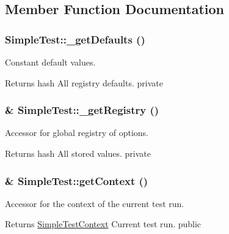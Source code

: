 \subsection{Member Function Documentation}
\hypertarget{class_simple_test_aca4dc7253ba3fb6593993372d955c5c4}{
\subsubsection[{\_\-getDefaults}]{\setlength{\rightskip}{0pt plus 5cm}SimpleTest::\_\-getDefaults ()}}
\label{class_simple_test_aca4dc7253ba3fb6593993372d955c5c4}
Constant default values. \begin{DoxyReturn}{Returns}
hash All registry defaults.  private 
\end{DoxyReturn}
\hypertarget{class_simple_test_a89b05bdd90acbaa574ea20d088e99b0f}{
\subsubsection[{\_\-getRegistry}]{\setlength{\rightskip}{0pt plus 5cm}\& SimpleTest::\_\-getRegistry ()}}
\label{class_simple_test_a89b05bdd90acbaa574ea20d088e99b0f}
Accessor for global registry of options. \begin{DoxyReturn}{Returns}
hash All stored values.  private 
\end{DoxyReturn}
\hypertarget{class_simple_test_ad88a0ca3dbedbac5471e1c29239f5f71}{
\subsubsection[{getContext}]{\setlength{\rightskip}{0pt plus 5cm}\& SimpleTest::getContext ()}}
\label{class_simple_test_ad88a0ca3dbedbac5471e1c29239f5f71}
Accessor for the context of the current test run. \begin{DoxyReturn}{Returns}
\hyperlink{class_simple_test_context}{SimpleTestContext} Current test run.  public 
\end{DoxyReturn}
